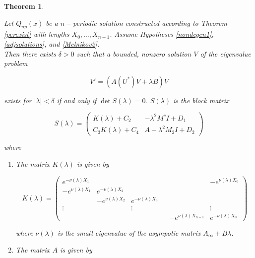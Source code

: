 \documentclass[12pt]{article}
\newtheorem{theorem}{Theorem}
\begin{document}
\begin{theorem}\label{PDEeigtheorem}

Let $Q_{np}(x)$ be a $n-$periodic solution constructed according to Theorem \ref{perexist} with lengths $X_0, \dots, X_{n-1}$. Assume Hypotheses \ref{nondegen1}, \ref{adjsolutions}, and \ref{Melnikov2}.\\

Then there exists $\delta > 0$ such that a bounded, nonzero solution $V$ of the eigenvalue problem 

\begin{equation}
V' = ( A(U^*)V + \lambda B)V 
\end{equation}

exists for $|\lambda| < \delta$ if and only if $\det S(\lambda) = 0$. $S(\lambda)$ is the block matrix

\begin{equation}\label{blockmatrix}
S(\lambda) = 
\begin{pmatrix}
K(\lambda) + C_2 & -\lambda^2 M^c I + D_1 \\
C_3 K(\lambda) + C_4 & A - \lambda^2 M_2 I + D_2
\end{pmatrix}
\end{equation}

where 

\begin{enumerate}

\item The matrix $K(\lambda)$ is given by

\begin{equation}
K(\lambda) = 
\begin{pmatrix}
e^{-\nu(\lambda)X_1} & & & & & -e^{\nu(\lambda)X_0} \\
-e^{\nu(\lambda)X_1} & e^{-\nu(\lambda)X_2} \\
& -e^{\nu(\lambda)X_2} & e^{-\nu(\lambda)X_3} \\
\vdots & & \vdots & &&  \vdots \\
& & & & -e^{\nu(\lambda)X_{n-1}} & e^{-\nu(\lambda)X_0} 
\end{pmatrix}
\end{equation}

where $\nu(\lambda)$ is the small eigenvalue of the asympotic matrix $A_\infty + B \lambda$.

\item The matrix $A$ is given by


\end{enumerate}
\end{theorem}
\end{document}
